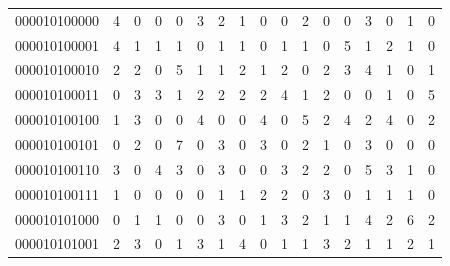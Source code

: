 \documentclass[10pt,a4paper]{article}
\begin{document}
\begin{longtable}{ |c|c|c|c|c|c|c|c|c|c|c|c|c|c|c|c|c| }
    000010100000              & 4                            & 0                                & 0                            & 0                              & 3   & 2   & 1   & 0   & 0   & 2   & 0   & 0   & 3   & 0   & 1   & 0   \\
    000010100001              & 4                            & 1                                & 1                            & 1                              & 0   & 1   & 1   & 0   & 1   & 1   & 0   & 5   & 1   & 2   & 1   & 0   \\
    000010100010              & 2                            & 2                                & 0                            & 5                              & 1   & 1   & 2   & 1   & 2   & 0   & 2   & 3   & 4   & 1   & 0   & 1   \\
    000010100011              & 0                            & 3                                & 3                            & 1                              & 2   & 2   & 2   & 2   & 4   & 1   & 2   & 0   & 0   & 1   & 0   & 5   \\
    000010100100              & 1                            & 3                                & 0                            & 0                              & 4   & 0   & 0   & 4   & 0   & 5   & 2   & 4   & 2   & 4   & 0   & 2   \\
    000010100101              & 0                            & 2                                & 0                            & 7                              & 0   & 3   & 0   & 3   & 0   & 2   & 1   & 0   & 3   & 0   & 0   & 0   \\
    000010100110              & 3                            & 0                                & 4                            & 3                              & 0   & 3   & 0   & 0   & 3   & 2   & 2   & 0   & 5   & 3   & 1   & 0   \\
    000010100111              & 1                            & 0                                & 0                            & 0                              & 0   & 1   & 1   & 2   & 2   & 0   & 3   & 0   & 1   & 1   & 1   & 0   \\
    000010101000              & 0                            & 1                                & 1                            & 0                              & 0   & 3   & 0   & 1   & 3   & 2   & 1   & 1   & 4   & 2   & 6   & 2   \\
    000010101001              & 2                            & 3                                & 0                            & 1                              & 3   & 1   & 4   & 0   & 1   & 1   & 3   & 2   & 1   & 1   & 2   & 1   \\

\end{longtable}
\end{document}
